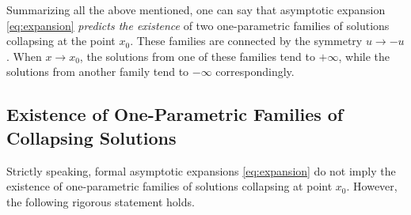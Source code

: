 Summarizing all the above mentioned, one can say that asymptotic expansion \eqref{eq:expansion} {\it predicts the existence} of two one-parametric families of solutions collapsing at the point $x_0$.
These families are connected by the symmetry $u \to -u$.
When $x \to x_0$, the solutions from one of these families tend to $+\infty$, while the solutions from another family tend to $-\infty$ correspondingly.

\subsection{Existence of One-Parametric Families of Collapsing Solutions}

Strictly speaking, formal asymptotic expansions \eqref{eq:expansion} do not imply the existence of one-parametric families of solutions collapsing at point $x_0$.
However, the following rigorous statement holds.


